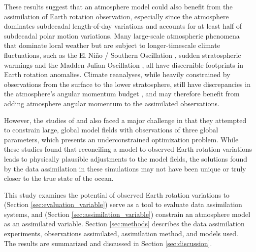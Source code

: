 These results suggest that an atmosphere model could also benefit from the assimilation of Earth rotation observation, especially since the atmosphere dominates subdecadal length-of-day variations and accounts for at least half of subdecadal polar motion variations. 
Many large-scale atmospheric phenomena that dominate local weather but are subject to longer-timescale climate fluctuations, such as 
the El Ni\~no / Southern Oscillation \citep{Chao1984},
sudden stratospheric warmings \citep{Neef2014} and the Madden Julian Oscillation \citep{Weickmann1992}, all have discernible footprints in Earth rotation anomalies. 
Climate reanalyses, while heavily constrained by observations from the surface to the lower stratosphere, still have discrepancies in the atmosphere's angular momentum budget \citep{Berrisford2011,Lehmann2012}, and  may therefore benefit from adding atmosphere angular momentum to the assimilated observations. 

However, the studies of \citet{Saynisch2010,Saynisch2011} and \citet{Saynisch2012} also faced a major challenge in that they attempted to constrain large, global model fields with observations of three global parameters, which presents an underconstrained optimization problem. 
While these studies found that reconciling a model to observed Earth rotation variations leads to physically plausible adjustments to the model fields, the solutions found by the data assimilation in these simulations may not have been unique or truly closer to the true state of the ocean.  

This study examines the potential of observed Earth rotation variations to (Section \ref{sec:evaluation_variable}) serve as a tool to evaluate data assimilation systems, and (Section \ref{sec:assimilation_variable}) constrain an atmosphere model as an assimilated variable.
Section \ref{sec:methods} describes the data assimilation experiments, observations assimilated, assimilation method, and models used.
The results are summarized and discussed in Section \ref{sec:discussion}.
